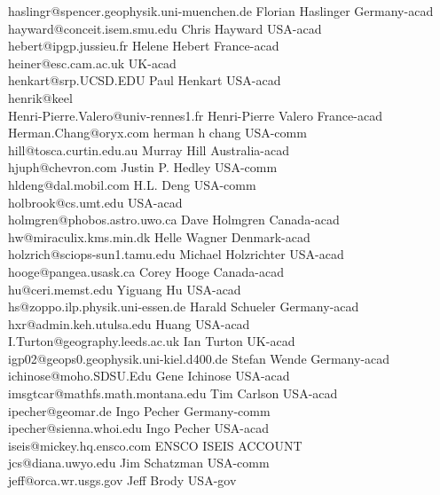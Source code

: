 \begin{tabbing}
haslingr@spencer.geophysik.uni-muenchen.de \> Florian Haslinger \> Germany-acad\\
hayward@conceit.isem.smu.edu \> Chris Hayward \> USA-acad\\
hebert@ipgp.jussieu.fr \> Helene Hebert \> France-acad\\
heiner@esc.cam.ac.uk \> \> UK-acad\\
henkart@srp.UCSD.EDU \> Paul Henkart \> USA-acad\\
henrik@keel \> \>\\
Henri-Pierre.Valero@univ-rennes1.fr \> Henri-Pierre Valero \> France-acad\\
Herman.Chang@oryx.com \> herman h chang \> USA-comm\\ 
hill@tosca.curtin.edu.au \> Murray Hill \> Australia-acad\\
hjuph@chevron.com \> Justin P. Hedley \> USA-comm\\
hldeng@dal.mobil.com \> H.L. Deng \>  USA-comm\\
holbrook@cs.umt.edu \> \> USA-acad\\
holmgren@phobos.astro.uwo.ca \> Dave Holmgren \> Canada-acad\\
hw@miraculix.kms.min.dk \>  Helle Wagner \> Denmark-acad\\
holzrich@sciops-sun1.tamu.edu \> Michael Holzrichter \> USA-acad\\
hooge@pangea.usask.ca \> Corey Hooge \> Canada-acad\\
hu@ceri.memst.edu \> Yiguang Hu \> USA-acad\\
hs@zoppo.ilp.physik.uni-essen.de \> Harald Schueler \> Germany-acad\\
hxr@admin.keh.utulsa.edu \> Huang \>  USA-acad\\
I.Turton@geography.leeds.ac.uk \> Ian Turton \> UK-acad\\
igp02@geops0.geophysik.uni-kiel.d400.de \> Stefan Wende \> Germany-acad\\
ichinose@moho.SDSU.Edu \> Gene Ichinose \> USA-acad\\
imsgtcar@mathfs.math.montana.edu \> Tim Carlson \> USA-acad\\
ipecher@geomar.de \> Ingo Pecher \> Germany-comm\\
ipecher@sienna.whoi.edu \> Ingo Pecher \> USA-acad\\
iseis@mickey.hq.ensco.com \> ENSCO ISEIS ACCOUNT \>\\
jcs@diana.uwyo.edu \> Jim Schatzman \> USA-comm\\
jeff@orca.wr.usgs.gov \>  Jeff Brody \> USA-gov\\

\end{tabbing}
